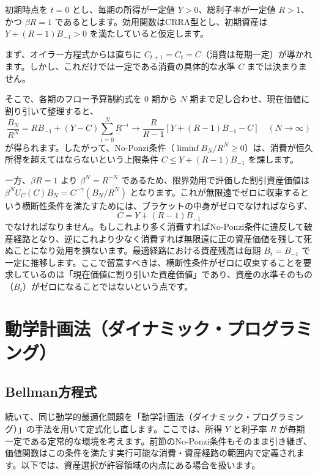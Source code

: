 \documentclass[
  japanese,
  lualatex,
  ja=standard,
  12pt,
  a4paper]{ltjsarticle}
\begin{document}
初期時点を \(t=0\) とし、毎期の所得が一定値 \(Y>0\)、総利子率が一定値
\(R>1\)、かつ \(\beta R=1\)
であるとします。効用関数はCRRA型とし、初期資産は \(Y + (R-1)B_{-1} > 0\)
を満たしていると仮定します。

まず、オイラー方程式からは直ちに
\(C_{t+1} = C_t = C\)（消費は毎期一定）が導かれます。しかし、これだけでは一定である消費の具体的な水準
\(C\) までは決まりません。

そこで、各期のフロー予算制約式を \(0\) 期から \(N\)
期まで足し合わせ、現在価値に割り引いて整理すると、 \[
\frac{B_N}{R^N} = R B_{-1} + (Y-C)\sum_{i=0}^{N} R^{-i} \longrightarrow \frac{R}{R-1} \left[ Y + (R-1)B_{-1} - C \right] \quad (N \to \infty)
\]
が得られます。したがって、No-Ponzi条件（\(\liminf B_N/R^N \geq 0\)）は、消費が恒久所得を超えてはならないという上限条件
\(C \leq Y + (R-1)B_{-1}\) を課します。

一方、\(\beta R=1\) より \(\beta^N = R^{-N}\)
であるため、限界効用で評価した割引資産価値は
\(\beta^N U_C(C) B_N = C^{-\gamma} (B_N / R^N)\)
となります。これが無限遠でゼロに収束するという横断性条件を満たすためには、ブラケットの中身がゼロでなければならず、
\[
C = Y + (R-1)B_{-1}
\]
でなければなりません。もしこれより多く消費すればNo-Ponzi条件に違反して破産経路となり、逆にこれより少なく消費すれば無限遠に正の資産価値を残して死ぬことになり効用を損ないます。最適経路における資産残高は毎期
\(B_t = B_{-1}\)
で一定に推移します。ここで留意すべきは、横断性条件がゼロに収束することを要求しているのは「現在価値に割り引いた資産価値」であり、資産の水準そのもの（\(B_t\)）がゼロになることではないという点です。

\section{動学計画法（ダイナミック・プログラミング）}\label{ux52d5ux5b66ux8a08ux753bux6cd5ux30c0ux30a4ux30caux30dfux30c3ux30afux30d7ux30edux30b0ux30e9ux30dfux30f3ux30b0}

\subsection{Bellman方程式}\label{bellmanux65b9ux7a0bux5f0f}

続いて、同じ動学的最適化問題を「動学計画法（ダイナミック・プログラミング）」の手法を用いて定式化し直します。ここでは、所得
\(Y\) と利子率 \(R\)
が毎期一定である定常的な環境を考えます。前節のNo-Ponzi条件もそのまま引き継ぎ、価値関数はこの条件を満たす実行可能な消費・資産経路の範囲内で定義されます。以下では、資産選択が許容領域の内点にある場合を扱います。
\end{document}
